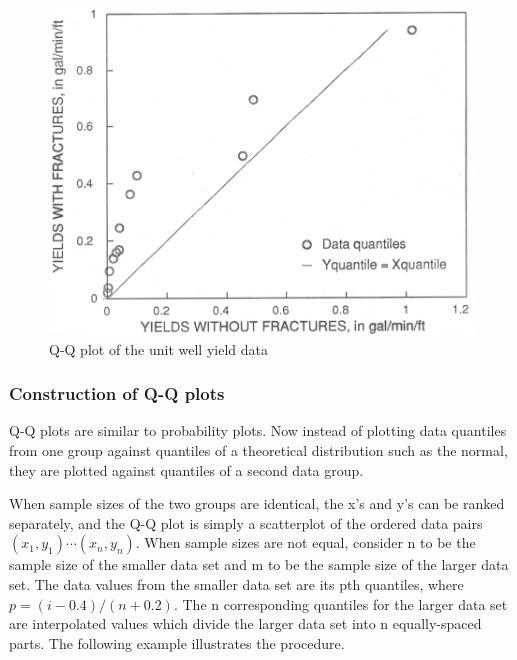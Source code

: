 \documentclass[]{book}
\begin{document}
\begin{figure}

{\centering \includegraphics[width=12.57in]{figures/2_23} 

}

\caption{Q-Q plot of the unit well yield data}\label{fig:fig-2-23}
\end{figure}

\hypertarget{construction-of-q-q-plots}{%
\subsubsection{Construction of Q-Q plots}\label{construction-of-q-q-plots}}

Q-Q plots are similar to probability plots. Now instead of plotting data quantiles from one group against quantiles of a theoretical distribution such as the normal, they are plotted against quantiles of a second data group.

When sample sizes of the two groups are identical, the x's and y's can be ranked separately, and the Q-Q plot is simply a scatterplot of the ordered data pairs \((x_{1}, y_{1}) \cdots (x_{n}, y_{n})\). When sample sizes are not equal, consider n to be the sample size of the smaller data set and m to be the sample size of the larger data set. The data values from the smaller data set are its pth quantiles, where \(p = (i − 0.4) / (n + 0.2)\). The n corresponding quantiles for the larger data set are interpolated values which divide the larger data set into n equally-spaced parts. The following example illustrates the procedure.
\end{document}
